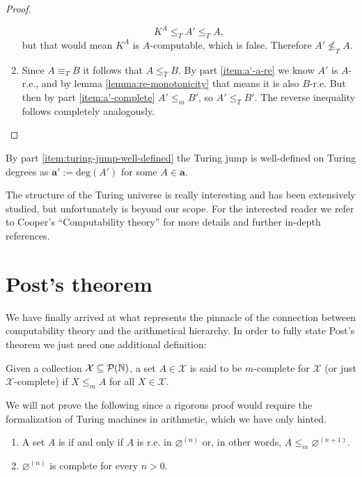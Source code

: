 \documentclass[../main.tex]{memoir}
\begin{document}
\begin{proof}
\begin{enumerate}[label=(\roman*), ref=(\roman*)]
    \[ K^A \le_T A' \le_T A, \]
    but that would mean $K^A$ is $A$-computable, which is false. Therefore $A' \not\le_T A$.
  \item Since $A \equiv_T B$ it follows that $A \le_T B$. By part \ref{item:a'-a-re} we know $A'$ is $A$-r.e., and by lemma \ref{lemma:re-monotonicity} that means it is also $B$-r.e. But then by part \ref{item:a'-complete} $A' \le_m B'$, so $A' \le_T B'$. The reverse inequality follows completely analogously.
  \end{enumerate}
\end{proof}

\begin{corollary}
  By part \ref{item:turing-jump-well-defined} the Turing jump is well-defined on Turing degrees as $\mathbf{a}' := \text{deg}(A')$ for some $A \in \mathbf{a}$.
\end{corollary}

The structure of the Turing universe is really interesting and has been extensively studied, but unfortunately is beyond our scope. For the interested reader we refer to Cooper's ``Computability theory'' \cite{cooper} for more details and further in-depth references.

\section{Post's theorem}

We have finally arrived at what represents the pinnacle of the connection between computability theory and the arithmetical hierarchy. In order to fully state Post's theorem we just need one additional definition:

\begin{definition}[$m$-completeness]
  Given a collection $\mathcal{X} \subseteq \mathcal{P}(\mathbb{N})$, a set $A \in \mathcal{X}$ is said to be $m$-complete for $\mathcal{X}$ (or just $\mathcal{X}$-complete) if $X \le_m A$ for all $X \in \mathcal{X}$.
\end{definition}

We will not prove the following since a rigorous proof would require the formalization of Turing machines in arithmetic, which we have only hinted.

\begin{theorem}
  \begin{enumerate}
  \item A set $A$ is  if and only if $A$ is r.e. in $\varnothing^{(n)}$ or, in other words, $A \le_m \varnothing^{(n + 1)}$.
  \item $\varnothing^{(n)}$ is  complete for every $n > 0$.
  \end{enumerate}
\end{theorem}
\end{document}
